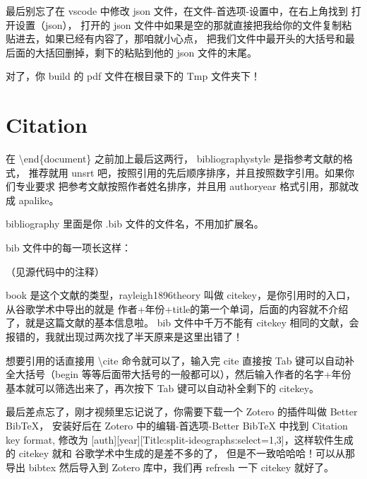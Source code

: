 最后别忘了在 vscode 中修改 json 文件，在文件-首选项-设置中，在右上角找到 打开设置（json），
打开的 json 文件中如果是空的那就直接把我给你的文件复制粘贴进去，如果已经有内容了，那咱就小心点，
把我们文件中最开头的大括号和最后面的大括回删掉，剩下的粘贴到他的 json 文件的末尾。

对了，你 build 的 pdf 文件在根目录下的 Tmp 文件夹下！

\section{Citation}
在 \textbackslash end\{document\} 之前加上最后这两行， bibliographystyle 是指参考文献的格式，
推荐就用 unsrt 吧，按照引用的先后顺序排序，并且按照数字引用。如果你们专业要求
把参考文献按照作者姓名排序，并且用 authoryear 格式引用，那就改成 apalike。

bibliography 里面是你 .bib 文件的文件名，不用加扩展名\cite{Garzone2002Interpretinginthe,Gentzler2017Translationandrewriting,JinYing2018JiaoTiChuan}。

bib 文件中的每一项长这样：

（见源代码中的注释）

book 是这个文献的类型，rayleigh1896theory 叫做 citekey，是你引用时的入口，从谷歌学术中导出的就是\cite{LiYaShu2017KeXueFan}
作者+年份+title的第一个单词，后面的内容就不介绍了，就是这篇文献的基本信息啦。
bib 文件中千万不能有 citekey 相同的文献，会报错的，我就出现过两次找了半天原来是这里出错了！

想要引用的话直接用 \textbackslash cite 命令就可以了，输入完 cite 直接按 Tab
键可以自动补全大括号（begin 等等后面带大括号的一般都可以），然后输入作者的名字+年份
基本就可以筛选出来了，再次按下 Tab 键可以自动补全剩下的 citekey\cite{Malmkjaer2017TheRoutledgeHandbook,Officer1958Introductiontothe,TanXueLan2019DangDaiYi}。

最后差点忘了，刚才视频里忘记说了，你需要下载一个 Zotero 的插件叫做 Better BibTeX，
安装好后在 Zotero 中的编辑-首选项-Better BibTeX 中找到 Citation key format, 
修改为 [auth][year][Title:split-ideographs:select=1,3]，这样软件生成的 citekey 就和
谷歌学术中生成的是差不多的了\cite{WangBinHua2019KouYiLi,XuMing2016YiShiChang}，
但是不一致哈哈哈！可以从那导出 bibtex 然后导入到 Zotero 库中，我们再 refresh 一下 citekey 就好了。

\clearpage %


